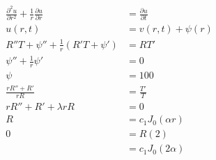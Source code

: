 \documentclass{article}
\begin{document}
\subsubsection{}

\begin{align*}
  \frac{\partial^2 u}{\partial r^2} + \frac{1}{r} \frac{\partial u}{\partial r} & = \frac{\partial u}{\partial t}                                                                                   \\
  u(r, t)                                                                       & = v(r, t) + \psi(r)                                                                                               \\
  R'' T + \psi'' + \frac{1}{r} (R' T + \psi')                                   & = R T'                                                                                                            \\
  \psi'' + \frac{1}{r} \psi'                                                    & = 0                                                                                                               \\
  \psi                                                                          & = 100                                                                                                             \\
  \frac{r R'' + R'}{r R}                                                        & = \frac{T'}{T}                                                                                                    \\
  r R'' + R' + \lambda r R                                                      & = 0                                                                                                               \\
  R                                                                             & = c_1 J_0(\alpha r)                                                                                               \\
  0                                                                             & = R(2)                                                                                                            \\
                                                                                & = c_1 J_0(2 \alpha)                                                                                               \\

\end{align*}
\end{document}
